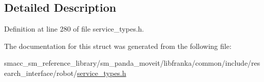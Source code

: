 \subsection{Detailed Description}


Definition at line 280 of file service\+\_\+types.\+h.



The documentation for this struct was generated from the following file\+:\begin{DoxyCompactItemize}
\item 
smacc\+\_\+sm\+\_\+reference\+\_\+library/sm\+\_\+panda\+\_\+moveit/libfranka/common/include/research\+\_\+interface/robot/\hyperlink{service__types_8h}{service\+\_\+types.\+h}\end{DoxyCompactItemize}
